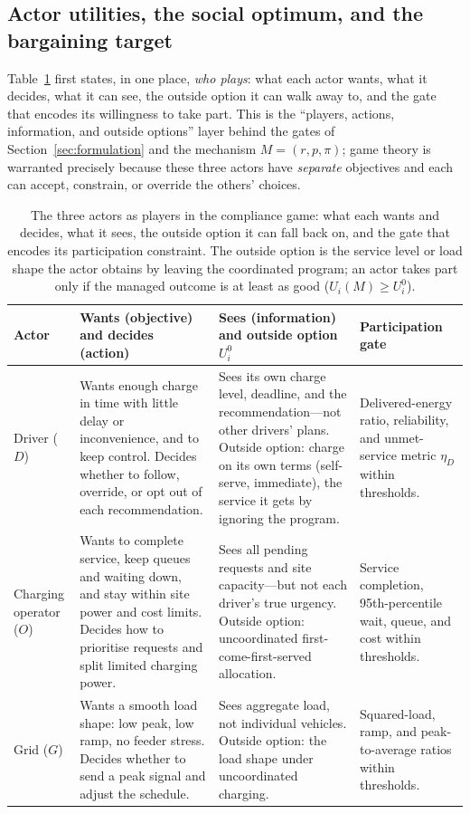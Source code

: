 \documentclass[12pt]{article}
\begin{document}
\subsection{Actor utilities, the social optimum, and the bargaining target}

Table~\ref{tab:actors} first states, in one place, \emph{who plays}: what each actor wants, what it decides, what it can see, the outside option it can walk away to, and the gate that encodes its willingness to take part. This is the ``players, actions, information, and outside options'' layer behind the gates of Section~\ref{sec:formulation} and the mechanism $M=(r,p,\pi)$; game theory is warranted precisely because these three actors have \emph{separate} objectives and each can accept, constrain, or override the others' choices.

\begin{table}[t]
\centering
\caption{The three actors as players in the compliance game: what each wants and decides, what it sees, the outside option it can fall back on, and the gate that encodes its participation constraint. The outside option is the service level or load shape the actor obtains by leaving the coordinated program; an actor takes part only if the managed outcome is at least as good ($U_i(M)\ge U_i^0$).}
\label{tab:actors}
\begin{tabularx}{\textwidth}{p{}XXp{}}
\hline
Actor & Wants (objective) and decides (action) & Sees (information) and outside option $U_i^0$ & Participation gate \\
\hline
Driver ($D$) & Wants enough charge in time with little delay or inconvenience, and to keep control. Decides whether to follow, override, or opt out of each recommendation. & Sees its own charge level, deadline, and the recommendation---not other drivers' plans. Outside option: charge on its own terms (self-serve, immediate), the service it gets by ignoring the program. & Delivered-energy ratio, reliability, and unmet-service metric $\eta_D$ within thresholds. \\
Charging operator ($O$) & Wants to complete service, keep queues and waiting down, and stay within site power and cost limits. Decides how to prioritise requests and split limited charging power. & Sees all pending requests and site capacity---but not each driver's true urgency. Outside option: uncoordinated first-come-first-served allocation. & Service completion, 95th-percentile wait, queue, and cost within thresholds. \\
Grid ($G$) & Wants a smooth load shape: low peak, low ramp, no feeder stress. Decides whether to send a peak signal and adjust the schedule. & Sees aggregate load, not individual vehicles. Outside option: the load shape under uncoordinated charging. & Squared-load, ramp, and peak-to-average ratios within thresholds. \\
\hline
\end{tabularx}
\end{table}
\end{document}
